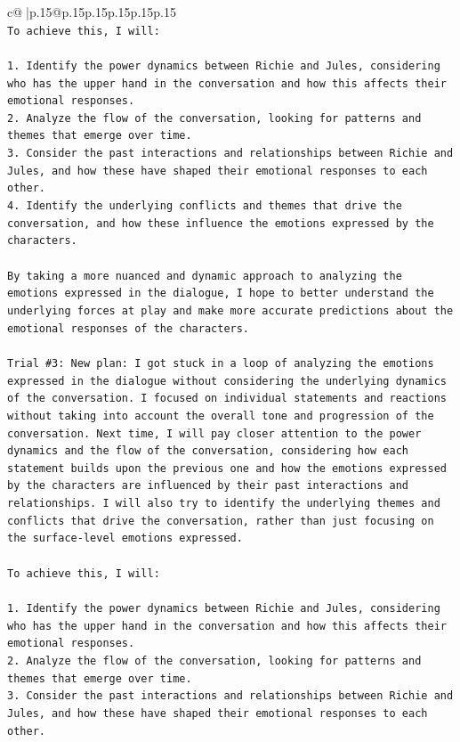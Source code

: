 \documentclass{article}
\begin{document}
{\begin{supertabular}{c@{$\;$}|p{.15\linewidth}@{}p{.15\linewidth}p{.15\linewidth}p{.15\linewidth}p{.15\linewidth}p{.15\linewidth}}
{{{\\ 
\texttt{To achieve this, I will:} \\
\\ 
\texttt{1. Identify the power dynamics between Richie and Jules, considering who has the upper hand in the conversation and how this affects their emotional responses.} \\
\texttt{2. Analyze the flow of the conversation, looking for patterns and themes that emerge over time.} \\
\texttt{3. Consider the past interactions and relationships between Richie and Jules, and how these have shaped their emotional responses to each other.} \\
\texttt{4. Identify the underlying conflicts and themes that drive the conversation, and how these influence the emotions expressed by the characters.} \\
\\ 
\texttt{By taking a more nuanced and dynamic approach to analyzing the emotions expressed in the dialogue, I hope to better understand the underlying forces at play and make more accurate predictions about the emotional responses of the characters.} \\
\\ 
\texttt{Trial \#3: New plan: I got stuck in a loop of analyzing the emotions expressed in the dialogue without considering the underlying dynamics of the conversation. I focused on individual statements and reactions without taking into account the overall tone and progression of the conversation. Next time, I will pay closer attention to the power dynamics and the flow of the conversation, considering how each statement builds upon the previous one and how the emotions expressed by the characters are influenced by their past interactions and relationships. I will also try to identify the underlying themes and conflicts that drive the conversation, rather than just focusing on the surface{-}level emotions expressed.} \\
\\ 
\texttt{To achieve this, I will:} \\
\\ 
\texttt{1. Identify the power dynamics between Richie and Jules, considering who has the upper hand in the conversation and how this affects their emotional responses.} \\
\texttt{2. Analyze the flow of the conversation, looking for patterns and themes that emerge over time.} \\
\texttt{3. Consider the past interactions and relationships between Richie and Jules, and how these have shaped their emotional responses to each other.} \\
}}}
\end{supertabular}}
\end{document}
